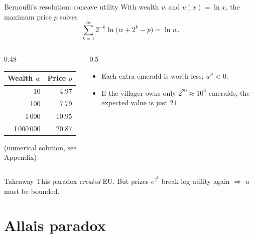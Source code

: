 \documentclass[12pt]{beamer}
\begin{document}
\begin{frame}{Bernoulli's resolution: concave utility}
\small
With wealth $w$ and $u(x)=\ln x$, the maximum price $p$ solves
\vspace{-4pt}
\[
\sum_{k=1}^{\infty}2^{-k}\ln\!\big(w+2^{k}-p\big)=\ln w .
\]
\begin{columns}[T]
\begin{column}{0.48\textwidth}
\centering
\small
\begin{tabular}{rr}
\toprule
Wealth $w$ & Price $p$ \\
\midrule
10 & 4.97\\
100 & 7.79\\
1\,000 & 10.95\\
1\,000\,000 & 20.87\\
\bottomrule
\end{tabular}

\smallskip
{\footnotesize (numerical solution, see Appendix)}
\end{column}
\begin{column}{0.5\textwidth}
\begin{itemize}
  \item Each extra emerald is worth less: $u''<0$.
  \item If the villager owns only $2^{20}\approx10^6$ emeralds, the expected value is just $21$.
\end{itemize}
\end{column}
\end{columns}
\begin{block}{Takeaway}
This paradox \emph{created} EU. But prizes $e^{2^k}$ break log utility again $\Rightarrow$ $u$ must be bounded.
\end{block}
\end{frame}

\section{Allais paradox}
\end{document}
